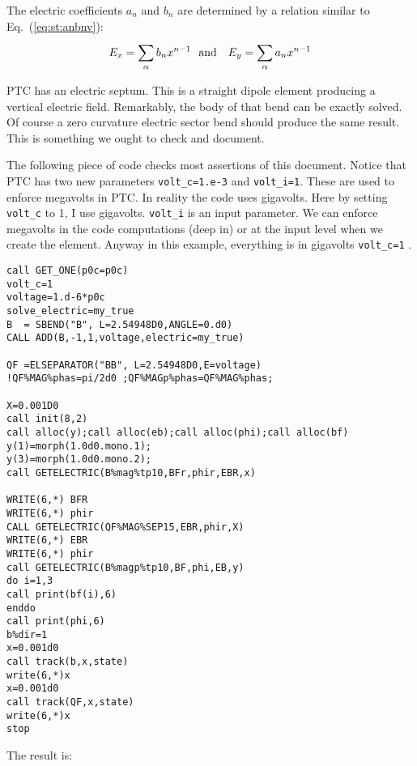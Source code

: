 \documentclass[11pt]{article} %
\def\eq#1{Eq.~(\ref{#1})}
\begin{document}
The electric coefficients $a_n$ and $b_n$ are determined by a relation similar to \eq{eq:st:anbnv}:
%
\begin{eqnarray}{E}_{x}=
\sum\limits_{\alpha }^{} {b}_{n}{x}^{n-1}~~{\rm a}{\rm n}{\rm d} ~~~{E}_{y}=
\sum\limits_{\alpha }^{} {a}_{n}{x}^{n-1}\end{eqnarray}
%
%

PTC has an electric septum. This is a straight dipole element producing a  vertical electric field. Remarkably, the body of that bend can be exactly solved.
Of course a zero curvature electric sector bend should produce the same result. This is something we ought to check and document.

The following piece of code checks most assertions of this document. Notice that PTC has two new parameters {\tt volt_c=1.e-3} and {\tt volt_i=1}. These are used to enforce megavolts in PTC. In reality the code uses gigavolts. Here by setting {\tt volt_c} to 1, I use gigavolts. {\tt volt_i}   is an input parameter. We can enforce megavolts in the code computations (deep in) or at the input level when we create the element. Anyway in this example, everything  is in gigavolts  {\tt volt_c=1} .

\begin{verbatim}
call GET_ONE(p0c=p0c)
volt_c=1
voltage=1.d-6*p0c
solve_electric=my_true
B  = SBEND("B", L=2.54948D0,ANGLE=0.d0) 
CALL ADD(B,-1,1,voltage,electric=my_true)

QF =ELSEPARATOR("BB", L=2.54948D0,E=voltage)
!QF%MAG%phas=pi/2d0 ;QF%MAGp%phas=QF%MAG%phas;

X=0.001D0
call init(8,2)
call alloc(y);call alloc(eb);call alloc(phi);call alloc(bf)
y(1)=morph(1.0d0.mono.1);
y(3)=morph(1.0d0.mono.2);
call GETELECTRIC(B%mag%tp10,BFr,phir,EBR,x)

WRITE(6,*) BFR
WRITE(6,*) phir
CALL GETELECTRIC(QF%MAG%SEP15,EBR,phir,X)
WRITE(6,*) EBR
WRITE(6,*) phir
call GETELECTRIC(B%magp%tp10,BF,phi,EB,y)
do i=1,3
call print(bf(i),6)
enddo
call print(phi,6)
b%dir=1
x=0.001d0 
call track(b,x,state)
write(6,*)x
x=0.001d0 
call track(QF,x,state)
write(6,*)x
stop
\end{verbatim}


The result is:
\end{document}
